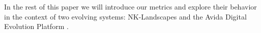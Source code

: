 \documentclass[letterpaper]{article}
\begin{document}



In the rest of this paper we will introduce our metrics and explore their behavior in the context of two evolving systems: NK-Landscapes \citep{kauffman_towards_1987} and the Avida Digital Evolution Platform \citep{ofria_avida:_2004}.


\end{document}
